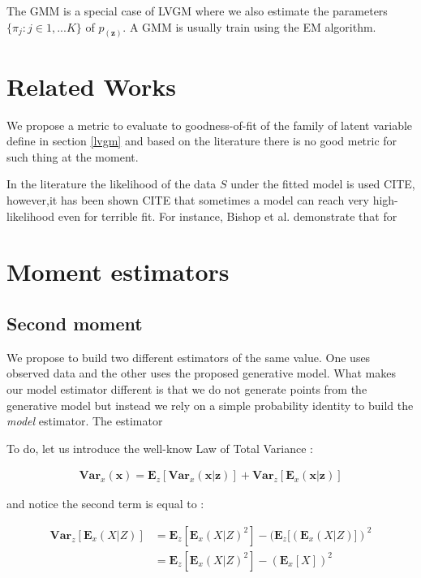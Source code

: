 \documentclass{article}
\newcommand{\Vx}{\textbf{Var}_x}
\newcommand{\Ex}{\textbf{E}_x}
\newcommand{\Vz}{\textbf{Var}_z}
\newcommand{\Ez}{\textbf{E}_z}
\newcommand{\x}{\mathbf{x}}
\newcommand{\z}{\mathbf{z}}
\begin{document}
\bigskip

The GMM is a special case of LVGM where we also estimate the parameters $\{\pi_j : j \in 1,...K\}$ of $p_(\z)$. A GMM is usually train using the EM algorithm. 

\section{Related Works} \label{rewo}

We propose a metric to evaluate to goodness-of-fit of the family of latent variable define in section \ref{lvgm} and based on the literature there is no good metric for such thing at the moment. 

\bigskip

In the literature the likelihood of the data $S$ under the fitted model is used CITE, however,it has been shown CITE that sometimes a model can reach very high-likelihood even for terrible fit. For instance, Bishop et al. \cite{Bishop07} demonstrate that for   

\section{Moment estimators} \label{moes}

\subsection{Second moment}

We propose to build two different estimators of the same value. One uses observed data and the other uses the proposed generative model. What makes our model estimator different is that we do not generate points from the generative model but instead we rely on a simple probability identity to build the \textit{model} estimator. The estimator 

\bigskip

To do, let us introduce the well-know Law of Total Variance :


\begin{align}
\Vx(\x) = \Ez[\Vx(\x|\z)] + \Vz[\Ex(\x|\z)]
\end{align}

and notice the second term is equal to :

\begin{align}
\Vz[\Ex(X|Z)] &= \Ez[\Ex(X|Z)^2] - (\Ez[(\Ex(X|Z)])^2 \\
&= \Ez[\Ex(X|Z)^2] - (\Ex[X])^2
\end{align}
\end{document}
